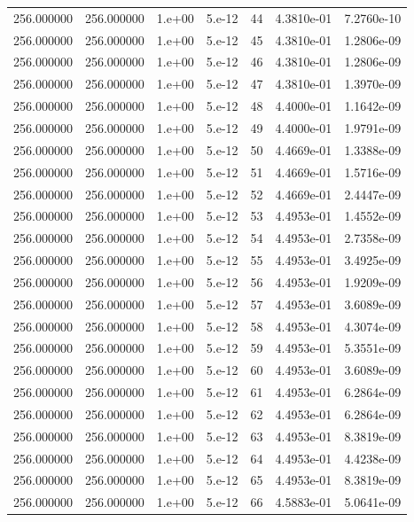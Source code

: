 \begin{table}[htbp]
\begin{tabular}{rrrrrrr}
256.000000 & 256.000000 & 1.e+00 & 5.e-12 & 44 & 4.3810e-01 & 7.2760e-10 \\
256.000000 & 256.000000 & 1.e+00 & 5.e-12 & 45 & 4.3810e-01 & 1.2806e-09 \\
256.000000 & 256.000000 & 1.e+00 & 5.e-12 & 46 & 4.3810e-01 & 1.2806e-09 \\
256.000000 & 256.000000 & 1.e+00 & 5.e-12 & 47 & 4.3810e-01 & 1.3970e-09 \\
256.000000 & 256.000000 & 1.e+00 & 5.e-12 & 48 & 4.4000e-01 & 1.1642e-09 \\
256.000000 & 256.000000 & 1.e+00 & 5.e-12 & 49 & 4.4000e-01 & 1.9791e-09 \\
256.000000 & 256.000000 & 1.e+00 & 5.e-12 & 50 & 4.4669e-01 & 1.3388e-09 \\
256.000000 & 256.000000 & 1.e+00 & 5.e-12 & 51 & 4.4669e-01 & 1.5716e-09 \\
256.000000 & 256.000000 & 1.e+00 & 5.e-12 & 52 & 4.4669e-01 & 2.4447e-09 \\
256.000000 & 256.000000 & 1.e+00 & 5.e-12 & 53 & 4.4953e-01 & 1.4552e-09 \\
256.000000 & 256.000000 & 1.e+00 & 5.e-12 & 54 & 4.4953e-01 & 2.7358e-09 \\
256.000000 & 256.000000 & 1.e+00 & 5.e-12 & 55 & 4.4953e-01 & 3.4925e-09 \\
256.000000 & 256.000000 & 1.e+00 & 5.e-12 & 56 & 4.4953e-01 & 1.9209e-09 \\
256.000000 & 256.000000 & 1.e+00 & 5.e-12 & 57 & 4.4953e-01 & 3.6089e-09 \\
256.000000 & 256.000000 & 1.e+00 & 5.e-12 & 58 & 4.4953e-01 & 4.3074e-09 \\
256.000000 & 256.000000 & 1.e+00 & 5.e-12 & 59 & 4.4953e-01 & 5.3551e-09 \\
256.000000 & 256.000000 & 1.e+00 & 5.e-12 & 60 & 4.4953e-01 & 3.6089e-09 \\
256.000000 & 256.000000 & 1.e+00 & 5.e-12 & 61 & 4.4953e-01 & 6.2864e-09 \\
256.000000 & 256.000000 & 1.e+00 & 5.e-12 & 62 & 4.4953e-01 & 6.2864e-09 \\
256.000000 & 256.000000 & 1.e+00 & 5.e-12 & 63 & 4.4953e-01 & 8.3819e-09 \\
256.000000 & 256.000000 & 1.e+00 & 5.e-12 & 64 & 4.4953e-01 & 4.4238e-09 \\
256.000000 & 256.000000 & 1.e+00 & 5.e-12 & 65 & 4.4953e-01 & 8.3819e-09 \\
256.000000 & 256.000000 & 1.e+00 & 5.e-12 & 66 & 4.5883e-01 & 5.0641e-09 \\

\end{tabular}
\end{table}
